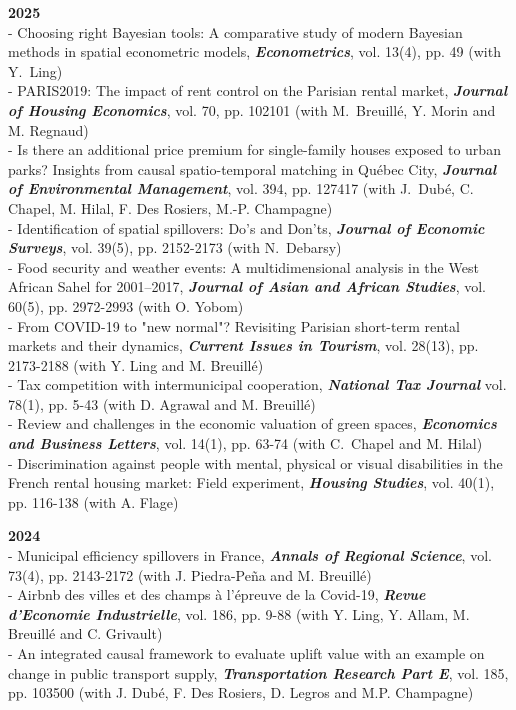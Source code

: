 \documentclass[a4paper,12pt]{article}
\begin{document}
\noindent \textbf{2025}  \smallskip \\ 
- Choosing right Bayesian tools: A comparative study of modern Bayesian methods in spatial econometric models, \textit{\textbf{Econometrics}}, vol. 13(4), pp. 49 (with Y.~Ling) \\
- PARIS2019: The impact of rent control on the Parisian rental market, \textit{\textbf{Journal of Housing Economics}}, vol. 70, pp. 102101  (with M.~Breuillé, Y. Morin and M. Regnaud) \\
- Is there an additional price premium for single-family houses exposed to urban parks? Insights from causal spatio-temporal matching in Québec City, \textit{\textbf{Journal of Environmental Management}}, vol. 394, pp. 127417 (with J.~Dubé, C. Chapel, M. Hilal, F. Des Rosiers, M.-P. Champagne) \\
- Identification of spatial spillovers: Do's and Don'ts, \textit{\textbf{Journal of Economic Surveys}}, vol. 39(5), pp. 2152-2173 (with N.~Debarsy) \\
- Food security and weather events: A multidimensional analysis in the West African Sahel for 2001–2017, \textit{\textbf{Journal of Asian and African Studies}}, vol. 60(5), pp. 2972-2993 (with O. Yobom) \\
- From COVID-19 to "new normal"? Revisiting Parisian short-term rental markets and their dynamics, \textit{\textbf{Current Issues in Tourism}}, vol. 28(13), pp. 2173-2188 (with Y. Ling and M. Breuillé) \\
- Tax competition with intermunicipal cooperation, \textit{\textbf{National Tax Journal}} vol. 78(1), pp. 5-43 (with D. Agrawal and M. Breuillé) \\
- Review and challenges in the economic valuation of green spaces, \textit{\textbf{Economics and Business Letters}}, vol. 14(1), pp. 63-74 (with C.~Chapel and M. Hilal) \\
- Discrimination against people with mental, physical or visual disabilities in the French rental housing market: Field experiment, \textit{\textbf{Housing Studies}}, vol. 40(1), pp. 116-138 (with A. Flage) \\

\newpage


\noindent \textbf{2024}  \smallskip \\ 
- Municipal efficiency spillovers in France, \textit{\textbf{Annals of Regional Science}}, vol. 73(4), pp. 2143-2172  (with J. Piedra-Peña and M. Breuillé) \\
- Airbnb des villes et des champs à l'épreuve de la Covid-19, \textit{\textbf{Revue d'Economie Industrielle}}, vol. 186, pp. 9-88 (with Y. Ling, Y. Allam, M. Breuillé and C. Grivault) \\
- An integrated causal framework to evaluate uplift value with an example on change in public transport supply, \textit{\textbf{Transportation Research Part E}}, vol. 185, pp. 103500  (with J. Dubé, F. Des Rosiers, D. Legros and M.P. Champagne) \\
\end{document}
